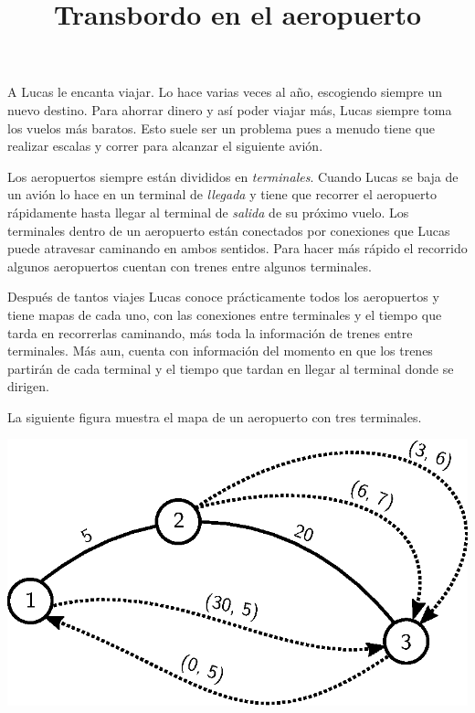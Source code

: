 \documentclass{oci}
\title{Transbordo en el aeropuerto}
\begin{document}
\begin{problemDescription}
  A Lucas le encanta viajar.
  Lo hace varias veces al año, escogiendo siempre un nuevo destino. %
  Para ahorrar dinero y así poder viajar más, Lucas siempre toma los vuelos más
  baratos.
  Esto suele ser un problema pues a menudo tiene que realizar escalas y correr
  para alcanzar el siguiente avión.

  Los aeropuertos siempre están divididos en \emph{terminales}.
  Cuando Lucas se baja de un avión lo hace en un terminal de \emph{llegada} y
  tiene que recorrer el aeropuerto rápidamente hasta llegar al terminal de \emph{salida} de su próximo vuelo.
  Los terminales dentro de un aeropuerto están conectados por conexiones que Lucas
  puede atravesar caminando en ambos sentidos.
  Para hacer más rápido el recorrido algunos aeropuertos cuentan con 
  trenes entre algunos terminales.
  
  Después de tantos viajes Lucas conoce prácticamente todos los aeropuertos
  y tiene mapas de cada uno, con las conexiones entre terminales
  y el tiempo que tarda en recorrerlas caminando, 
  más toda la información de trenes entre terminales.
  Más aun, cuenta con información del momento en que los trenes partirán de cada
  terminal y el tiempo que tardan en llegar al terminal donde se dirigen.
  

  La siguiente figura muestra el mapa de un aeropuerto %
  con tres terminales.
  
  \begin{center}
  \includegraphics[scale=0.7]{aeropuerto}
  \end{center}  
  

\end{problemDescription}
\end{document}
